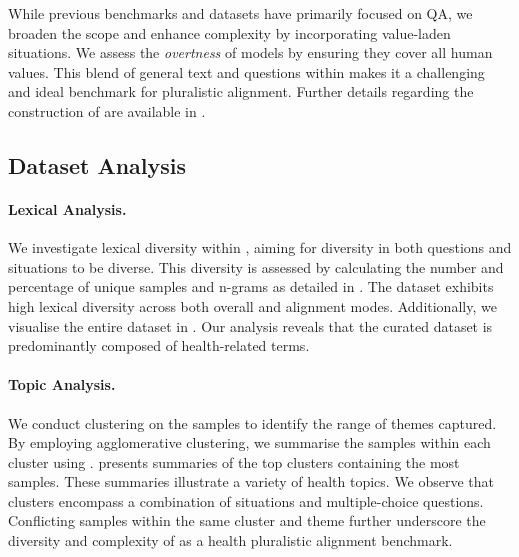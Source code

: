While previous benchmarks and datasets have primarily focused on QA, we broaden the scope and enhance complexity by incorporating value-laden situations. We assess the \textit{overtness} of models by ensuring they cover all human values. This blend of general text and questions within \ourdataset makes it a challenging and ideal benchmark for pluralistic alignment. Further details regarding the construction of \ourdataset are available in .


\subsection{Dataset Analysis}






\paragraph{Lexical Analysis.}

We investigate lexical diversity within \ourdataset, aiming for diversity in both questions and situations to be diverse. This diversity is assessed by calculating the number and percentage of unique samples and n-grams as detailed in . The dataset exhibits high lexical diversity across both overall and alignment modes. Additionally, we visualise the entire dataset in . Our analysis reveals that the curated dataset is predominantly composed of health-related terms.



\paragraph{Topic Analysis.}
We conduct clustering on the samples to identify the range of themes captured. By employing agglomerative clustering, we summarise the samples within each cluster using \gptFour.  presents summaries of the top clusters containing the most samples. These summaries illustrate a variety of health topics. We observe that clusters encompass a combination of situations and multiple-choice questions. Conflicting samples within the same cluster and theme further underscore the diversity and complexity of \ourdataset as a health pluralistic alignment benchmark.



